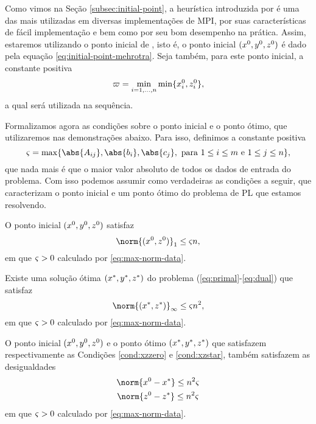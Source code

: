Como vimos na Seção \ref{subsec:initial-point}, a heurística introduzida por \textcite{Mehrotra:1992wr} é uma das mais utilizadas em diversas implementações de \acl{MPI}, por suas características de fácil implementação e bem como por seu  bom desempenho na prática.
Assim, estaremos utilizando o ponto inicial de \citeauthor{Mehrotra:1992wr}, isto é, o ponto inicial $(x^0 ,y^0,z^0 )$ é dado pela equação \eqref{eq:initial-point-mehrotra}. Seja também, para este ponto inicial, a constante positiva
\begin{equation}
\label{eq:bdxzzero}
	\varpi= \min_{i=1,\ldots,n}\min\{x^0_{i},z^0_{i}\},
\end{equation}
a qual será utilizada na sequência.



Formalizamos agora as condições sobre o ponto inicial e o ponto ótimo, que utilizaremos nas demonstrações abaixo. Para isso, definimos a constante positiva
\begin{equation}
	\label{eq:max-norm-data}
 	\bdxzstar = \max\{\abs{A_{ij}},\abs{b_{i}},\abs{c_{j}}, \text{ para } 1\leq i\leq m \text{ e } 1\leq j \leq n  \},
\end{equation}
que nada mais é que o maior valor absoluto de todos os dados de entrada do problema. 
Com isso podemos assumir como verdadeiras as  condições a seguir, que caracterizam o ponto inicial e um ponto ótimo do problema de PL que estamos resolvendo. 

\begin{cond} \label{cond:xzzero} O ponto inicial $(x^0 ,y^0,z^0 )$ satisfaz 
\begin{equation}
	\label{eq:norm-xz-zero}
	\norm{(\xzero,\zzero)}_{1} \leq \bdxzstar n,
\end{equation}
em que  $\varsigma>0$ calculado por \eqref{eq:max-norm-data}.
\end{cond}

\begin{cond} \label{cond:xzstar} Existe uma solução ótima $(x^*,y^*,z^*)$  do problema (\ref{eq:primal}-\ref{eq:dual}) que satisfaz 
\begin{equation}
	\label{eq:norm-xz-star}
	\norm{(\xstar,\zstar)}_{\infty} \leq \bdxzstar n^2,
\end{equation}
em que  $\varsigma>0$ calculado por \eqref{eq:max-norm-data}. 
\end{cond}



\begin{cond}\label{cond:x0-x*+z0-z*}  O ponto inicial $(x^0 ,y^0,z^0 )$ e o ponto ótimo $(x^*,y^*,z^*)$ que satisfazem respectivamente as Condições \ref{cond:xzzero} e \ref{cond:xzstar}, também satisfazem as desigualdades
\begin{subequations}\label{eq:x0-x*+z0-z*}
\begin{gather}
\norm{\xzero - \xstar} \leq n^2 \bdxzstar \label{eq:x0-x*} \\
\norm{\zzero - \zstar} \leq n^2\bdxzstar \label{eq:z0-z*}
\end{gather}
\end{subequations}
em que  $\varsigma>0$ calculado por \eqref{eq:max-norm-data}. 
\end{cond}


